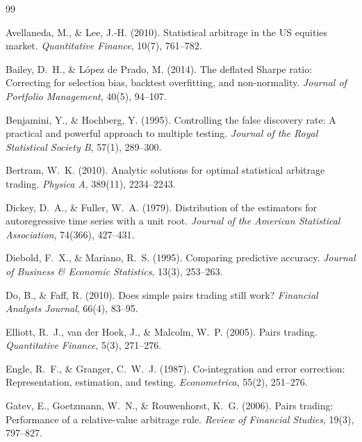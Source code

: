 \documentclass[11pt,a4paper]{article}
\theoremstyle{definition}
\begin{document}

\begin{thebibliography}{99}

Avellaneda, M., \& Lee, J.-H. (2010).
Statistical arbitrage in the US equities market.
\textit{Quantitative Finance}, 10(7), 761--782.

Bailey, D.~H., \& L\'opez de Prado, M. (2014).
The deflated Sharpe ratio: Correcting for selection bias, backtest overfitting,
and non-normality.
\textit{Journal of Portfolio Management}, 40(5), 94--107.

Benjamini, Y., \& Hochberg, Y. (1995).
Controlling the false discovery rate: A practical and powerful approach to
multiple testing.
\textit{Journal of the Royal Statistical Society B}, 57(1), 289--300.

Bertram, W.~K. (2010).
Analytic solutions for optimal statistical arbitrage trading.
\textit{Physica A}, 389(11), 2234--2243.

Dickey, D.~A., \& Fuller, W.~A. (1979).
Distribution of the estimators for autoregressive time series with a unit root.
\textit{Journal of the American Statistical Association}, 74(366), 427--431.

Diebold, F.~X., \& Mariano, R.~S. (1995).
Comparing predictive accuracy.
\textit{Journal of Business \& Economic Statistics}, 13(3), 253--263.

Do, B., \& Faff, R. (2010).
Does simple pairs trading still work?
\textit{Financial Analysts Journal}, 66(4), 83--95.

Elliott, R.~J., van der Hoek, J., \& Malcolm, W.~P. (2005).
Pairs trading.
\textit{Quantitative Finance}, 5(3), 271--276.

Engle, R.~F., \& Granger, C.~W.~J. (1987).
Co-integration and error correction: Representation, estimation, and testing.
\textit{Econometrica}, 55(2), 251--276.

Gatev, E., Goetzmann, W.~N., \& Rouwenhorst, K.~G. (2006).
Pairs trading: Performance of a relative-value arbitrage rule.
\textit{Review of Financial Studies}, 19(3), 797--827.


\end{thebibliography}
\end{document}
